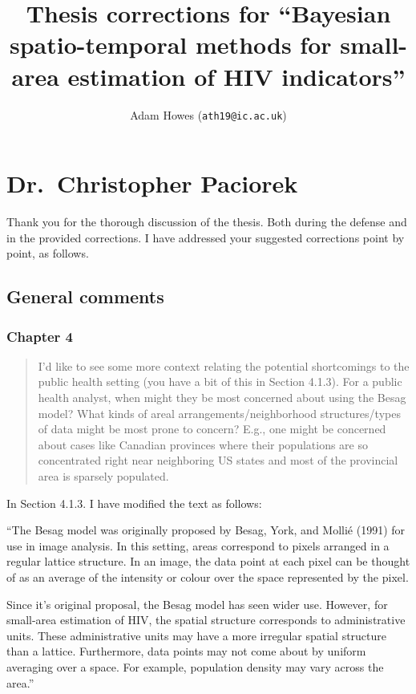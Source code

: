 \documentclass[
  12pt,
]{article}
\title{Thesis corrections for ``Bayesian spatio-temporal methods for
small-area estimation of HIV indicators''}
\subtitle{Adam Howes (\texttt{ath19@ic.ac.uk})}
\author{}
\date{\vspace{-2.5em}}
\begin{document}
\maketitle

{
\setcounter{tocdepth}{2}
\tableofcontents
}
\newpage

\section{Dr.~Christopher Paciorek}\label{dr.-christopher-paciorek}

Thank you for the thorough discussion of the thesis. Both during the
defense and in the provided corrections. I have addressed your suggested
corrections point by point, as follows.

\subsection{General comments}\label{general-comments}

\subsubsection{Chapter 4}\label{chapter-4}

\begin{quote}
I'd like to see some more context relating the potential shortcomings to
the public health setting (you have a bit of this in Section 4.1.3). For
a public health analyst, when might they be most concerned about using
the Besag model? What kinds of areal arrangements/neighborhood
structures/types of data might be most prone to concern? E.g., one might
be concerned about cases like Canadian provinces where their populations
are so concentrated right near neighboring US states and most of the
provincial area is sparsely populated.
\end{quote}

In Section 4.1.3. I have modified the text as follows:

``The Besag model was originally proposed by Besag, York, and Mollié
(1991) for use in image analysis. In this setting, areas correspond to
pixels arranged in a regular lattice structure. In an image, the data
point at each pixel can be thought of as an average of the intensity or
colour over the space represented by the pixel.

Since it's original proposal, the Besag model has seen wider use.
However, for small-area estimation of HIV, the spatial structure
corresponds to administrative units. These administrative units may have
a more irregular spatial structure than a lattice. Furthermore, data
points may not come about by uniform averaging over a space. For
example, population density may vary across the area.''
\end{document}
